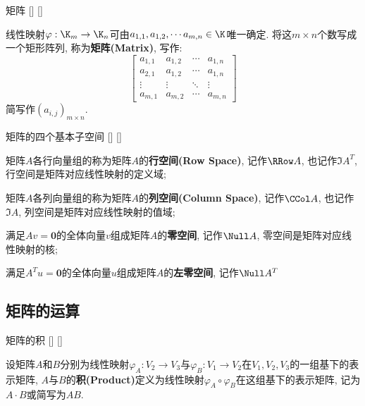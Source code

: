 \documentclass[UTF8]{ctexart}
\begin{document}
		\begin{dfn}
			[]
			{矩阵}
			[]
			[]

			线性映射$\varphi:\K_m\to \K_n$可由$a_{1,1},a_{1,2},\cdots a_{m,n}\in\K$唯一确定. 将这$m\times n$个数写成一个矩形阵列, 称为\textbf{矩阵(Matrix)}, 写作: 
			$$\begin{bmatrix}
				a_{1,1}&a_{1,2}&\cdots&a_{1,n}\\
				a_{2,1}&a_{1,2}&\cdots&a_{1,n}\\
				\vdots&\vdots&\ddots&\vdots\\
				a_{m,1}&a_{m,2}&\cdots&a_{m,n}
			\end{bmatrix}$$
			简写作$(a_{i,j})_{m\times n}$. 
		\end{dfn}
		
		\begin{dfn}
			[]
			{矩阵的四个基本子空间}
			[]
			[]

			矩阵$A$各行向量组 的 称为矩阵$A$的\textbf{行空间(Row Space)}, 记作$\RRow A$, 也记作$\Im A^T$, 行空间是矩阵对应线性映射的定义域; 
			
			矩阵$A$各列向量组 的 称为矩阵$A$的\textbf{列空间(Column Space)}, 记作$\CCol A$, 也记作$\Im A$, 列空间是矩阵对应线性映射的值域; 

			满足$Av=\mathbf{0}$的全体向量$v$组成矩阵$A$的\textbf{零空间}, 记作$\Null A$, 零空间是矩阵对应线性映射的核; 

			满足$A^T u=\mathbf{0}$的全体向量$u$组成矩阵$A$的\textbf{左零空间}, 记作$\Null A^T$
		\end{dfn}
	
	\subsection{矩阵的运算}
		\begin{dfn}
			[]
			{矩阵的积}
			[]
			[]

			设矩阵$A$和$B$分别为线性映射$\varphi_A: V_2\to V_3$与$\varphi_B:V_1\to V_2$在$V_1,V_2,V_3$的一组基下的表示矩阵, $A$与$B$的\textbf{积(Product)}定义为线性映射$\varphi_A\circ\varphi_B$在这组基下的表示矩阵, 记为$A\cdot B$或简写为$AB$. 
		\end{dfn}
		
\end{document}
